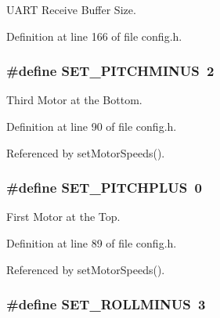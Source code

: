 U\-A\-R\-T Receive Buffer Size. 



Definition at line 166 of file config.\-h.

\hypertarget{group__config_ga8c969dbb07dc504226fc2c69484b9768}{
\subsubsection[{S\-E\-T\-\_\-\-P\-I\-T\-C\-H\-M\-I\-N\-U\-S}]{\setlength{\rightskip}{0pt plus 5cm}\#define S\-E\-T\-\_\-\-P\-I\-T\-C\-H\-M\-I\-N\-U\-S~2}}\label{group__config_ga8c969dbb07dc504226fc2c69484b9768}


Third Motor at the Bottom. 



Definition at line 90 of file config.\-h.



Referenced by set\-Motor\-Speeds().

\hypertarget{group__config_gaf0a00d922db66d875ca53f6db34e7307}{
\subsubsection[{S\-E\-T\-\_\-\-P\-I\-T\-C\-H\-P\-L\-U\-S}]{\setlength{\rightskip}{0pt plus 5cm}\#define S\-E\-T\-\_\-\-P\-I\-T\-C\-H\-P\-L\-U\-S~0}}\label{group__config_gaf0a00d922db66d875ca53f6db34e7307}


First Motor at the Top. 



Definition at line 89 of file config.\-h.



Referenced by set\-Motor\-Speeds().

\hypertarget{group__config_ga9921670161925a1d7b946aeb65d5767a}{
\subsubsection[{S\-E\-T\-\_\-\-R\-O\-L\-L\-M\-I\-N\-U\-S}]{\setlength{\rightskip}{0pt plus 5cm}\#define S\-E\-T\-\_\-\-R\-O\-L\-L\-M\-I\-N\-U\-S~3}}\label{group__config_ga9921670161925a1d7b946aeb65d5767a}


